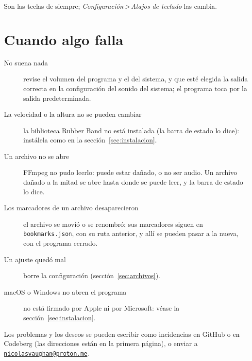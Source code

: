 \documentclass[12pt,
              article,
              oneside
              ]{memoir}
\newcommand*{\menu}[1]{\textit{#1}}
\newcommand*{\then}{\,>\,}
\begin{document}
\noindent Son las teclas de siempre; \menu{Configuración\then Atajos de
teclado} las cambia.

\section{Cuando algo falla}

%
\begin{description}
\item[No suena nada] revise el volumen del programa y el del sistema, y
  que esté elegida la salida correcta en la configuración del sonido del
  sistema; el programa toca por la salida predeterminada.
\item[La velocidad o la altura no se pueden cambiar] la biblioteca Rubber Band no está
  instalada (la barra de estado lo dice): instálela como en la
  sección~\ref{sec:instalacion}.
\item[Un archivo no se abre] FFmpeg no pudo leerlo: puede estar dañado, o
  no ser audio. Un archivo dañado a la mitad se abre hasta donde se puede
  leer, y la barra de estado lo dice.
\item[Los marcadores de un archivo desaparecieron] el archivo se movió o se
  renombró; sus marcadores siguen en \texttt{bookmarks.json}, con su ruta
  anterior, y allí se pueden pasar a la nueva, con el programa cerrado.
\item[Un ajuste quedó mal] borre la configuración
  (sección~\ref{sec:archivos}).
\item[macOS o Windows no abren el programa] no está firmado por Apple ni
  por Microsoft: véase la sección~\ref{sec:instalacion}.
\end{description}

\noindent
Los problemas y los deseos se pueden escribir como incidencias en GitHub o
en Codeberg (las direcciones están en la primera página), o enviar a
\href{mailto:nicolasvaughan@proton.me}{\texttt{nicolasvaughan@proton.me}}.

\printindex
\end{document}
